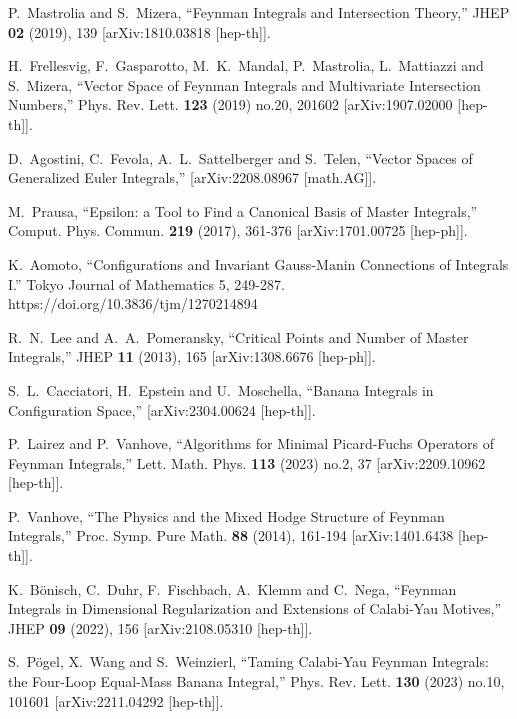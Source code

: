 \documentclass[a4paper,12pt]{article}
\numberwithin{equation}{section}
\numberwithin{figure}{subsection}
\theoremstyle{plain}
\theoremstyle{plain}
\theoremstyle{definition}
\theoremstyle{plain}
\theoremstyle{remark}
\theoremstyle{plain}
\begin{document}
\begin{thebibliography}{99}
P.~Mastrolia and S.~Mizera,
``Feynman Integrals and Intersection Theory,''
JHEP \textbf{02} (2019), 139
[arXiv:1810.03818 [hep-th]].

H.~Frellesvig, F.~Gasparotto, M.~K.~Mandal, P.~Mastrolia, L.~Mattiazzi and S.~Mizera,
``Vector Space of Feynman Integrals and Multivariate Intersection Numbers,''
Phys. Rev. Lett. \textbf{123} (2019) no.20, 201602
[arXiv:1907.02000 [hep-th]].

D.~Agostini, C.~Fevola, A.~L.~Sattelberger and S.~Telen,
``Vector Spaces of Generalized Euler Integrals,''
[arXiv:2208.08967 [math.AG]].

  
M.~Prausa,
``Epsilon: a Tool to Find a Canonical Basis of Master Integrals,''
Comput. Phys. Commun. \textbf{219} (2017), 361-376
[arXiv:1701.00725 [hep-ph]].

  K.~Aomoto, ``Configurations and Invariant Gauss-Manin Connections of Integrals I.'' Tokyo Journal of Mathematics 5, 249-287. https://doi.org/10.3836/tjm/1270214894



R.~N.~Lee and A.~A.~Pomeransky,
``Critical Points and Number of Master Integrals,''
JHEP \textbf{11} (2013), 165
[arXiv:1308.6676 [hep-ph]].
  
S.~L.~Cacciatori, H.~Epstein and U.~Moschella,
``Banana Integrals in Configuration Space,''
[arXiv:2304.00624 [hep-th]].
  
P.~Lairez and P.~Vanhove,
``Algorithms for Minimal Picard-Fuchs Operators of Feynman Integrals,''
Lett. Math. Phys. \textbf{113} (2023) no.2, 37
[arXiv:2209.10962 [hep-th]].

  
P.~Vanhove,
``The Physics and the Mixed Hodge Structure of Feynman Integrals,''
Proc. Symp. Pure Math. \textbf{88} (2014), 161-194
[arXiv:1401.6438 [hep-th]].


K.~B\"onisch, C.~Duhr, F.~Fischbach, A.~Klemm and C.~Nega,
``Feynman Integrals in Dimensional Regularization and Extensions of Calabi-Yau Motives,''
JHEP \textbf{09} (2022), 156
[arXiv:2108.05310 [hep-th]].


S.~P\"ogel, X.~Wang and S.~Weinzierl,
``Taming Calabi-Yau Feynman Integrals: the Four-Loop Equal-Mass Banana Integral,''
Phys. Rev. Lett. \textbf{130} (2023) no.10, 101601
[arXiv:2211.04292 [hep-th]].


\end{thebibliography}
\end{document}
